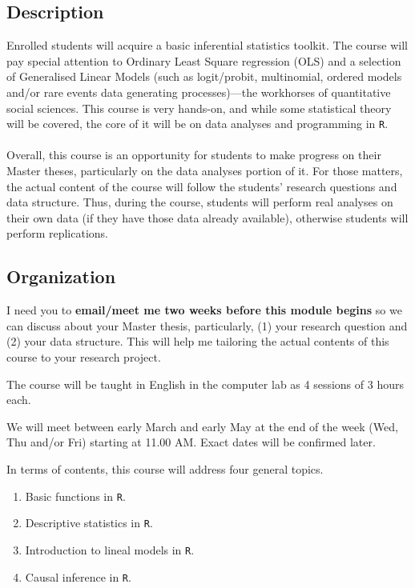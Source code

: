 \documentclass[letterpaper]{article}
\renewenvironment{itemize}{
  \begin{list}{}{
    \setlength{\leftmargin}{1.5em}
  }
}{
  \end{list}
}
\begin{document}
\subsection*{Description}

Enrolled students will acquire a basic inferential statistics toolkit. The course will pay special attention to Ordinary Least Square regression (OLS) and a selection of Generalised Linear Models (such as logit/probit, multinomial, ordered models and/or rare events data generating processes)---the workhorses of quantitative social sciences. This course is very hands-on, and while some statistical theory will be covered, the core of it will be on data analyses and programming in \texttt{R}. 
\\
\\
Overall, this course is an opportunity for students to make progress on their Master theses, particularly on the data analyses portion of it. For those matters, the actual content of the course will follow the students' research questions and data structure. Thus, during the course, students will perform real analyses on their own data (if they have those data already available), otherwise students will perform replications. 


\subsection*{Organization}

\begin{itemize}
  \item[{\color{red}\Pointinghand}] I need you to {\bf email/meet me two weeks before this module begins} so we can discuss about your Master thesis, particularly, (1) your research question and (2) your data structure. This will help me tailoring the actual contents of this course to your research project.
  \item[$\circ$] The course will be taught in English in the computer lab as 4 sessions of 3 hours each.
  \item[$\circ$] We will meet between early March and early May at the end of the week (Wed, Thu and/or Fri) starting at 11.00 AM. Exact dates will be confirmed later.
\end{itemize}

In terms of contents, this course will address four general topics.

\begin{enumerate}
	\item Basic functions in \texttt{R}.
	\item Descriptive statistics in \texttt{R}.
	\item Introduction to lineal models in \texttt{R}.
 	\item Causal inference in \texttt{R}.
\end{enumerate}
\end{document}
